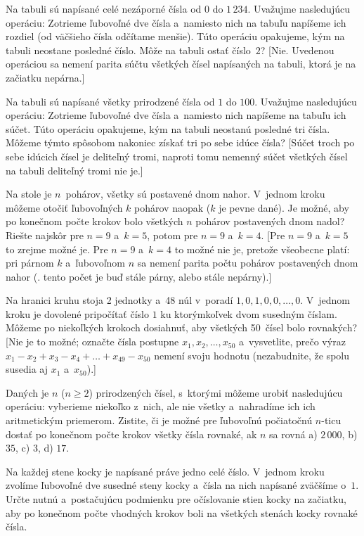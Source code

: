 {
Na tabuli sú napísané celé nezáporné čísla od $0$ do $1\,234$. Uvažujme
nasledujúcu operáciu: Zotrieme ľubovoľné dve čísla a~namiesto nich na
tabuľu napíšeme ich rozdiel (od väčšieho
čísla odčítame menšie). Túto operáciu opakujeme, kým na tabuli neostane
posledné číslo. Môže na tabuli ostať číslo~$2$?
[Nie. Uvedenou operáciou sa nemení parita súčtu všetkých čísel napísaných na
tabuli, ktorá je na začiatku nepárna.]

Na tabuli sú napísané všetky prirodzené čísla od $1$ do $100$. Uvažujme
nasledujúcu operáciu: Zotrieme ľubovoľné dve čísla a~namiesto nich napíšeme na
tabuľu ich súčet. Túto operáciu opakujeme, kým na tabuli neostanú
posledné tri čísla. Môžeme týmto spôsobom nakoniec získať tri po sebe idúce
čísla?
[Súčet troch po sebe idúcich čísel je deliteľný tromi, naproti tomu nemenný súčet
všetkých čísel na tabuli deliteľný tromi nie je.]

Na stole je $n$~pohárov, všetky sú postavené dnom nahor. V~jednom kroku
môžeme otočiť ľubovoľných $k$ pohárov naopak ($k$ je pevne dané). Je možné, aby
po konečnom
počte krokov bolo všetkých $n$ pohárov postavených dnom nadol? Riešte najskôr pre
$n = 9$ a~$k = 5$, potom pre $n = 9$ a~$k = 4$.
[Pre $n = 9$ a~$k = 5$ to zrejme možné je. Pre $n = 9$
a~$k = 4$ to možné nie je, pretože všeobecne platí: pri párnom $k$ a~ľubovoľnom
$n$ sa nemení parita počtu pohárov postavených dnom nahor (\tj. tento počet
je buď stále párny, alebo stále nepárny).]

Na hranici kruhu stoja 2 jednotky a~48 núl v~poradí $1, 0, 1, 0, 0, \dots,
0$. V~jednom kroku je dovolené pripočítať číslo $1$ ku ktorýmkoľvek dvom
susedným číslam. Môžeme po niekoľkých
krokoch dosiahnuť, aby všetkých 50~čísel bolo rovnakých? [Nie je to možné;
označte čísla
postupne $x_1, x_2, \dots , x_{50}$ a~vysvetlite, prečo výraz $x_1 - x_2 + x_3
- x_4 + \dots + x_{49} - x_{50}$
nemení svoju hodnotu (nezabudnite, že spolu susedia aj $x_1$ a~$x_{50}$).]

\D
Daných je $n$ ($n\ge2$) prirodzených čísel, s~ktorými môžeme urobiť nasledujúcu
operáciu: vyberieme niekoľko z~nich, ale nie všetky a~nahradíme ich ich
aritmetickým priemerom.
Zistite, či je možné pre ľubovoľnú počiatočnú $n$-ticu dostať po konečnom
počte krokov všetky čísla rovnaké, ak $n$ sa rovná a) $2\,000$, b) $35$,
c) $3$, d) $17$.
\vpravo{[51--B--I--4]}

Na každej stene kocky je napísané práve jedno celé číslo. V~jednom kroku
zvolíme ľubovoľné dve susedné steny kocky a~čísla na nich napísané
zväčšíme o~$1$. Určte nutnú a~postačujúcu podmienku pre očíslovanie stien
kocky na začiatku, aby po konečnom počte vhodných krokov boli na všetkých
stenách kocky rovnaké čísla.
\vpravo{[60--A--I--5]}

}
